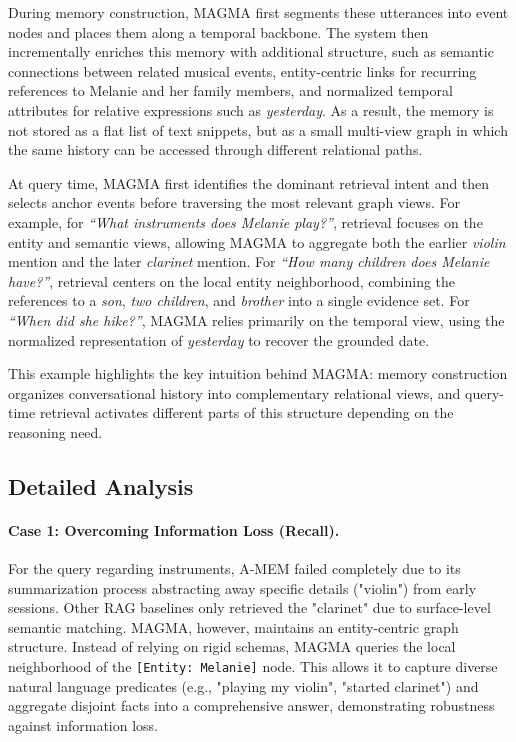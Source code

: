 \documentclass[11pt]{article}
\begin{document}
During memory construction, MAGMA first segments these utterances into event nodes and places them along a temporal backbone. The system then incrementally enriches this memory with additional structure, such as semantic connections between related musical events, entity-centric links for recurring references to Melanie and her family members, and normalized temporal attributes for relative expressions such as \textit{yesterday}. As a result, the memory is not stored as a flat list of text snippets, but as a small multi-view graph in which the same history can be accessed through different relational paths.

At query time, MAGMA first identifies the dominant retrieval intent and then selects anchor events before traversing the most relevant graph views. For example, for \textit{``What instruments does Melanie play?''}, retrieval focuses on the entity and semantic views, allowing MAGMA to aggregate both the earlier \textit{violin} mention and the later \textit{clarinet} mention. For \textit{``How many children does Melanie have?''}, retrieval centers on the local entity neighborhood, combining the references to a \textit{son}, \textit{two children}, and \textit{brother} into a single evidence set. For \textit{``When did she hike?''}, MAGMA relies primarily on the temporal view, using the normalized representation of \textit{yesterday} to recover the grounded date.

This example highlights the key intuition behind MAGMA: memory construction organizes conversational history into complementary relational views, and query-time retrieval activates different parts of this structure depending on the reasoning need.


\subsection{Detailed Analysis}

\paragraph{Case 1: Overcoming Information Loss (Recall).}
For the query regarding instruments, A-MEM failed completely due to its summarization process abstracting away specific details ("violin") from early sessions. Other RAG baselines only retrieved the "clarinet" due to surface-level semantic matching. MAGMA, however, maintains an entity-centric graph structure. Instead of relying on rigid schemas, MAGMA queries the local neighborhood of the \texttt{[Entity: Melanie]} node. This allows it to capture diverse natural language predicates (e.g., "playing my violin", "started clarinet") and aggregate disjoint facts into a comprehensive answer, demonstrating robustness against information loss.
\end{document}
